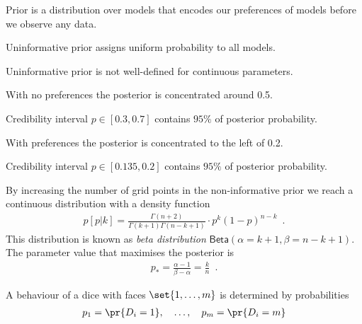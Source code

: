 \documentclass[landscape,footrule]{foils}
\begin{document}
Prior is a distribution over models that encodes our preferences of models before we observe any data.
\begin{triangles}
\item Uninformative prior assigns uniform probability to all models.
\item Uninformative prior is not well-defined for continuous parameters.  
\end{triangles}
   


\vspace*{-0.5cm}

\begin{triangles}
\item With no preferences the posterior is concentrated around 0.5.
\item Credibility interval $p\in[0.3,0.7]$ contains $95\%$ of posterior probability.
\end{triangles}


\vspace*{-0.5cm}

\begin{triangles}
\item With preferences the posterior is concentrated to the left of 0.2.
\item Credibility interval $p\in[0.135,0.2]$ contains $95\%$ of posterior probability.
\end{triangles}


By increasing the number of grid points in the non-informative prior we reach a continuous distribution with a density function
\begin{align*}  
p[p|k] = \frac{\Gamma(n+2)}{\Gamma(k+1)\Gamma(n-k+1)}\cdot p^k(1-p)^{n-k}\enspace.
\end{align*}
This distribution is known as \emph{beta distribution} $\mathsf{Beta}(\alpha=k+1, \beta=n-k+1)$.
The parameter value that maximises the posterior is 
\begin{align*}
p_* =\frac{\alpha-1}{\beta-\alpha}=\frac{k}{n}\enspace.
\end{align*} 


A behaviour of a dice with faces $\set{1,\ldots,m}$ is determined by probabilities 
\begin{align*}
p_1=\pr{D_i=1},\quad\ldots,\quad p_m=\pr{D_i=m}
\end{align*}
\end{document}
